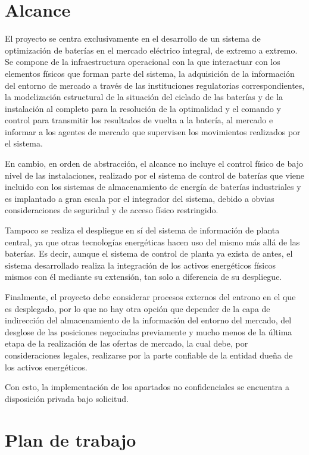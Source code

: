 \section{Alcance}
\label{makereference1.2}

El proyecto se centra exclusivamente en el desarrollo de un sistema de optimización de baterías en el mercado eléctrico integral, de extremo a extremo. Se compone de la infraestructura operacional con la que interactuar con los elementos físicos que forman parte del sistema, la adquisición de la información del entorno de mercado a través de las instituciones regulatorias correspondientes, la modelización estructural de la situación del ciclado de las baterías y de la instalación al completo para la resolución de la optimalidad y el comando y control para transmitir los resultados de vuelta a la batería, al mercado e informar a los agentes de mercado que supervisen los movimientos realizados por el sistema.

En cambio, en orden de abstracción, el alcance no incluye el control físico de bajo nivel de las instalaciones, realizado por el sistema de control de baterías que viene incluido con los sistemas de almacenamiento de energía de baterías industriales y es implantado a gran escala por el integrador del sistema, debido a obvias consideraciones de seguridad y de acceso físico restringido.

Tampoco se realiza el despliegue en sí del sistema de información de planta central, ya que otras tecnologías energéticas hacen uso del mismo más allá de las baterías. Es decir, aunque el sistema de control de planta ya exista de antes, el sistema desarrollado realiza la integración de los activos energéticos físicos mismos con él mediante su extensión, tan solo a diferencia de su despliegue.

Finalmente, el proyecto debe considerar procesos externos del entrono en el que es desplegado, por lo que no hay otra opción que depender de la capa de indirección del almacenamiento de la información del entorno del mercado, del desglose de las posiciones negociadas previamente y mucho menos de la última etapa de la realización de las ofertas de mercado, la cual debe, por consideraciones legales, realizarse por la parte confiable de la entidad dueña de los activos energéticos.

Con esto, la implementación de los apartados no confidenciales se encuentra a disposición privada bajo solicitud.

\section{Plan de trabajo}
\label{makereference1.3}

